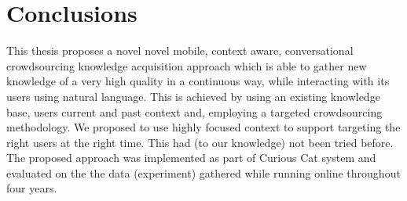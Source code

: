 % 
\chapter{Conclusions}
\label{chapter:conclusions}
This thesis proposes a novel novel mobile, context aware,
conversational crowdsourcing knowledge acquisition approach which is able to 
gather new knowledge of a very high quality in a continuous way, while 
interacting with its users using natural language. This is achieved by using an
existing knowledge base, users current and past context and, employing a 
targeted crowdsourcing methodology. We proposed to use highly focused context 
to support targeting the right users 
at the right time. This had (to our knowledge) not been tried before. The
proposed approach was implemented as part of Curious Cat system and evaluated 
on the the data (experiment) gathered while running online throughout four 
years. 

